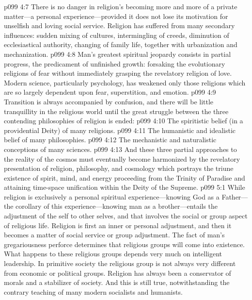 \pc \vs p099 4:7 There is no danger in religion’s becoming more and more of a private matter---a personal experience---provided it does not lose its motivation for unselfish and loving social service. Religion has suffered from many secondary influences: sudden mixing of cultures, intermingling of creeds, diminution of ecclesiastical authority, changing of family life, together with urbanization and mechanization.
\vs p099 4:8 Man’s greatest spiritual jeopardy consists in partial progress, the predicament of unfinished growth: forsaking the evolutionary religions of fear without immediately grasping the revelatory religion of love. Modern science, particularly psychology, has weakened only those religions which are so largely dependent upon fear, superstition, and emotion.
\vs p099 4:9 Transition is always accompanied by confusion, and there will be little tranquillity in the religious world until the great struggle between the three contending philosophies of religion is ended:
\pc \vs p099 4:10 \bibnobreakspace The spiritistic belief (in a providential Deity) of many religions.
\vs p099 4:11 \bibnobreakspace The humanistic and idealistic belief of many philosophies.
\vs p099 4:12 \bibnobreakspace The mechanistic and naturalistic conceptions of many sciences.
\pc \vs p099 4:13 And these three partial approaches to the reality of the cosmos must eventually become harmonized by the revelatory presentation of religion, philosophy, and cosmology which portrays the triune existence of spirit, mind, and energy proceeding from the Trinity of Paradise and attaining time\hyp{}space unification within the Deity of the Supreme.\plusone
{}
\vs p099 5:1 While religion is exclusively a personal spiritual experience---knowing God as a Father---the corollary of this experience---knowing man as a brother---entails the adjustment of the self to other selves, and that involves the social or group aspect of religious life. Religion is first an inner or personal adjustment, and then it becomes a matter of social service or group adjustment. The fact of man’s gregariousness perforce determines that religious groups will come into existence. What happens to these religious groups depends very much on intelligent leadership. In primitive society the religious group is not always very different from economic or political groups. Religion has always been a conservator of morals and a stabilizer of society. And this is still true, notwithstanding the contrary teaching of many modern socialists and humanists.
